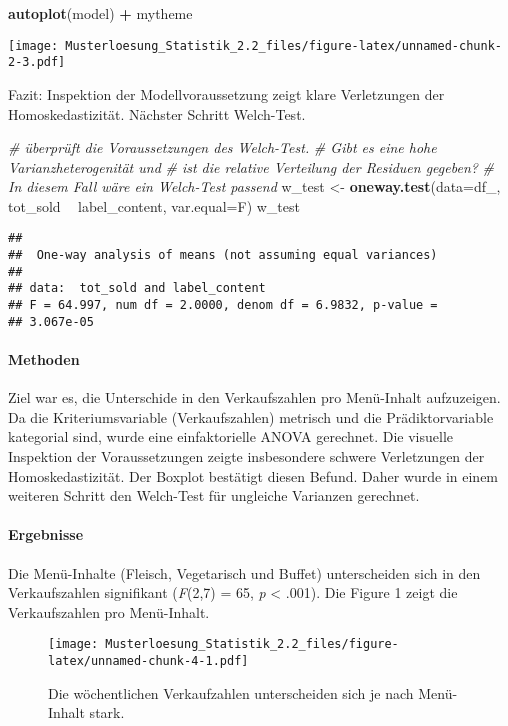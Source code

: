 \documentclass[]{article}
\newenvironment{Shaded}{\begin{snugshade}}{\end{snugshade}}
\newcommand{\KeywordTok}[1]{\textcolor[rgb]{0.13,0.29,0.53}{\textbf{#1}}}
\newcommand{\DataTypeTok}[1]{\textcolor[rgb]{0.13,0.29,0.53}{#1}}
\newcommand{\StringTok}[1]{\textcolor[rgb]{0.31,0.60,0.02}{#1}}
\newcommand{\CommentTok}[1]{\textcolor[rgb]{0.56,0.35,0.01}{\textit{#1}}}
\newcommand{\OperatorTok}[1]{\textcolor[rgb]{0.81,0.36,0.00}{\textbf{#1}}}
\newcommand{\NormalTok}[1]{#1}
\let\oldparagraph\paragraph
\renewcommand{\paragraph}[1]{\oldparagraph{#1}\mbox{}}
\begin{document}
\begin{Shaded}
\begin{Highlighting}[]
\KeywordTok{autoplot}\NormalTok{(model) }\OperatorTok{+}\StringTok{ }\NormalTok{mytheme }
\end{Highlighting}
\end{Shaded}

\texttt{[image: Musterloesung\_Statistik\_2.2\_files/figure-latex/unnamed-chunk-2-3.pdf]}

Fazit: Inspektion der Modellvoraussetzung zeigt klare Verletzungen der
Homoskedastizität. Nächster Schritt Welch-Test.

\begin{Shaded}
\begin{Highlighting}[]
\CommentTok{# überprüft die Voraussetzungen des Welch-Test.}
\CommentTok{# Gibt es eine hohe Varianzheterogenität und }
\CommentTok{# ist die relative Verteilung der Residuen gegeben? }
\CommentTok{# In diesem Fall wäre ein Welch-Test passend}
\NormalTok{w_test <-}\StringTok{ }\KeywordTok{oneway.test}\NormalTok{(}\DataTypeTok{data=}\NormalTok{df_, tot_sold }\OperatorTok{~}\StringTok{ }\NormalTok{label_content, }\DataTypeTok{var.equal=}\NormalTok{F)}
\NormalTok{w_test}
\end{Highlighting}
\end{Shaded}

\begin{verbatim}
## 
##  One-way analysis of means (not assuming equal variances)
## 
## data:  tot_sold and label_content
## F = 64.997, num df = 2.0000, denom df = 6.9832, p-value =
## 3.067e-05
\end{verbatim}

\paragraph{Methoden}\label{methoden}

Ziel war es, die Unterschide in den Verkaufszahlen pro Menü-Inhalt
aufzuzeigen. Da die Kriteriumsvariable (Verkaufszahlen) metrisch und die
Prädiktorvariable kategorial sind, wurde eine einfaktorielle ANOVA
gerechnet. Die visuelle Inspektion der Voraussetzungen zeigte
insbesondere schwere Verletzungen der Homoskedastizität. Der Boxplot
bestätigt diesen Befund. Daher wurde in einem weiteren Schritt den
Welch-Test für ungleiche Varianzen gerechnet.

\paragraph{Ergebnisse}\label{ergebnisse}

Die Menü-Inhalte (Fleisch, Vegetarisch und Buffet) unterscheiden sich in
den Verkaufszahlen signifikant (\emph{F}(2,7) = 65, \emph{p} \textless{}
.001). Die Figure 1 zeigt die Verkaufszahlen pro Menü-Inhalt.

\begin{figure}
\centering
\texttt{[image: Musterloesung\_Statistik\_2.2\_files/figure-latex/unnamed-chunk-4-1.pdf]}
\caption{Die wöchentlichen Verkaufzahlen unterscheiden sich je nach
Menü-Inhalt stark.}
\end{figure}
\end{document}
